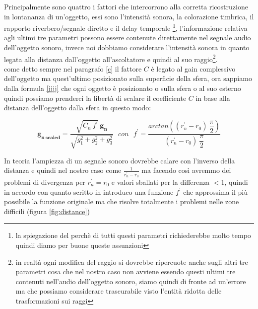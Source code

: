 \documentclass[12pt,a4paper]{report}
\begin{document}
Principalmente sono quattro i fattori che intercorrono alla corretta ricostruzione in lontananza di un'oggetto, essi sono l'intensità sonora, la colorazione timbrica, il rapporto riverbero/segnale diretto e il delay temporale \footnote{la spiegazione del perchè di tutti questi parametri richiederebbe molto tempo quindi diamo per buone queste assunzioni}, l'informazione relativa agli ultimi tre parametri possono essere contenute direttamente nel segnale audio dell'oggetto sonoro, invece noi dobbiamo considerare l'intensità sonora in quanto legata alla distanza dall'oggetto all'ascoltatore e quindi al suo raggio\footnote{in realtà ogni modifica del raggio si dovrebbe ripercuote anche sugli altri tre parametri cosa che nel nostro caso non avviene essendo questi ultimi tre contenuti nell'audio dell'oggetto sonoro, siamo quindi di fronte ad un'errore ma che possiamo considerare trascurabile visto l'entità ridotta delle trasformazioni sui raggi }.\\

come detto sempre nel paragrafo \ref{c} il fattore $C$ è legato al gain complessivo dell'oggetto ma quest'ultimo posizionato sulla superficie della sfera, ora sappiamo dalla formula \ref{jjjj} che ogni oggetto è posizionato o sulla sfera o al suo esterno quindi possiamo prenderci la libertà di scalare il coefficiente $C$ in base alla distanza dell'oggetto dalla sfera in questo modo:

\begin{equation}
\boldsymbol{g_{n\ scaled}} = \dfrac{\sqrt{C_n \ f^{\prime}}\ \boldsymbol{g_n}}{\sqrt{g_1^2 +g_2^2 + g_3^2}} \ \ \ con \ \ \ f^{\prime}= \frac{arctan\left((r_n^{\prime}-r_0)\ \dfrac{\pi}{2}\right)}{(r_n^{\prime}-r_0)\ \dfrac{\pi}{2}}
\label{kkkk}
\end{equation}

In teoria l'ampiezza di un segnale sonoro dovrebbe calare con l'inverso della distanza e quindi nel nostro caso come $\frac{1}{r_n^{\prime}-r_0}$ ma facendo così avremmo dei problemi di divergenza per $r_n^{\prime}=r_0$ e valori sballati per la differenza $<1$, quindi in accordo con quanto scritto in \cite{distanza} introduco una funzione $f^{\prime}$ che approssima il più possibile la funzione originale ma che risolve totalmente i problemi nelle zone difficili (figura \ref{fig:distance})\\
\end{document}
